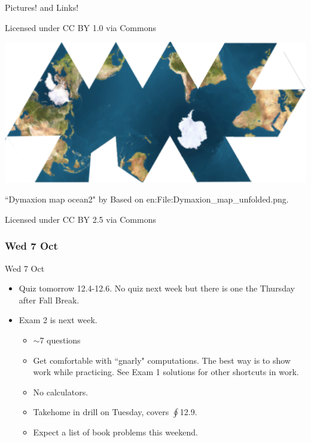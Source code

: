 \documentclass[12pt]{beamer}
\theoremstyle{plain}
\theoremstyle{definition}
\begin{document}
\begin{frame}[allowframebreaks]{\small Pictures! and Links!}
\begin{center}
Licensed under CC BY 1.0 via Commons
\end{center}
%
\framebreak
\begin{center}
\href{https://en.wikipedia.org/wiki/Dymaxion_map}{
\includegraphics[scale=0.4]{640px-Dymaxion_map_ocean2}
}

\vspace{0.5pc}
``Dymaxion map ocean2" by Based on en:File:Dymaxion\_map\_unfolded.png. 

Licensed under CC BY 2.5 via Commons
\end{center}
\end{frame}

\subsubsection{Wed 7 Oct}
\begin{frame}{Wed 7 Oct}%
\begin{itemize}
\item Quiz tomorrow 12.4-12.6.  No quiz next week but there is one the Thursday after Fall Break.
\item Exam 2 is next week.
	\begin{itemize}
	\item $\sim$7 questions
	\item Get comfortable with ``gnarly" computations.  The best way is to show work while practicing.  See Exam 1 solutions for other shortcuts in work.
	\item No calculators.  
	\item Takehome in drill on Tuesday, covers $\textstyle\oint$12.9.
	\item Expect a list of book problems this weekend.
	\end{itemize}
\end{itemize}
\end{frame}
\end{document}
